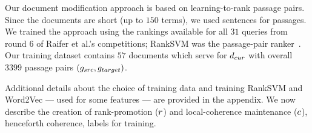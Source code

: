 
 
\label{sec:offline}
Our document modification approach is based on learning-to-rank
passage pairs. Since the documents are short (up to $150$ terms), we
used sentences for passages. We trained the approach using the
rankings available for all $31$ queries from round $6$ of Raifer et al.'s competitions; RankSVM was the
passage-pair ranker~\cite{Joachims:06a}. Our training dataset contains $57$ documents which serve for $d_{cur}$ with overall $3399$ passage
pairs $(g_{src},g_{target})$.



Additional details about the choice of training data and training RankSVM
and Word2Vec --- used for some features --- are provided in
the appendix. We now describe the creation of rank-promotion ($r$) and local-coherence maintenance ($c$), henceforth coherence, labels for training.


